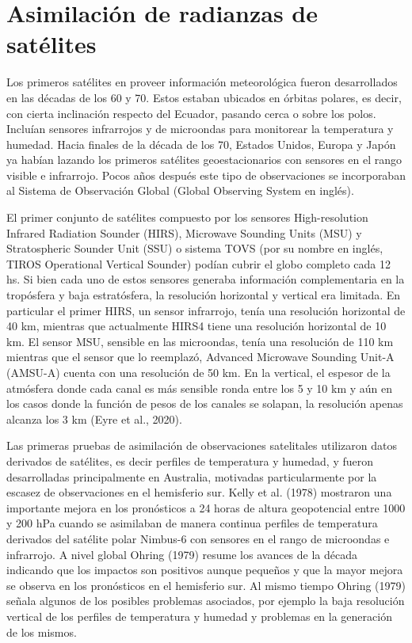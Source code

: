 \documentclass[12pt,oneside,a4paper]{reedthesis}
\begin{document}
\hypertarget{asim-rad}{%
\section{Asimilación de radianzas de satélites}\label{asim-rad}}

Los primeros satélites en proveer información meteorológica fueron desarrollados en las décadas de los 60 y 70. Estos estaban ubicados en órbitas polares, es decir, con cierta inclinación respecto del Ecuador, pasando cerca o sobre los polos. Incluían sensores infrarrojos y de microondas para monitorear la temperatura y humedad. Hacia finales de la década de los 70, Estados Unidos, Europa y Japón ya habían lazando los primeros satélites geoestacionarios con sensores en el rango visible e infrarrojo. Pocos años después este tipo de observaciones se incorporaban al Sistema de Observación Global (Global Observing System en inglés).

El primer conjunto de satélites compuesto por los sensores High-resolution Infrared Radiation Sounder (HIRS), Microwave Sounding Units (MSU) y Stratospheric Sounder Unit (SSU) o sistema TOVS (por su nombre en inglés, TIROS Operational Vertical Sounder) podían cubrir el globo completo cada 12 hs. Si bien cada uno de estos sensores generaba información complementaria en la tropósfera y baja estratósfera, la resolución horizontal y vertical era limitada. En particular el primer HIRS, un sensor infrarrojo, tenía una resolución horizontal de 40 km, mientras que actualmente HIRS4 tiene una resolución horizontal de 10 km. El sensor MSU, sensible en las microondas, tenía una resolución de 110 km mientras que el sensor que lo reemplazó, Advanced Microwave Sounding Unit-A (AMSU-A) cuenta con una resolución de 50 km. En la vertical, el espesor de la atmósfera donde cada canal es más sensible ronda entre los 5 y 10 km y aún en los casos donde la función de pesos de los canales se solapan, la resolución apenas alcanza los 3 km (Eyre et al., 2020).

Las primeras pruebas de asimilación de observaciones satelitales utilizaron datos derivados de satélites, es decir perfiles de temperatura y humedad, y fueron desarrolladas principalmente en Australia, motivadas particularmente por la escasez de observaciones en el hemisferio sur. Kelly et al. (1978) mostraron una importante mejora en los pronósticos a 24 horas de altura geopotencial entre 1000 y 200 hPa cuando se asimilaban de manera continua perfiles de temperatura derivados del satélite polar Nimbus-6 con sensores en el rango de microondas e infrarrojo. A nivel global Ohring (1979) resume los avances de la década indicando que los impactos son positivos aunque pequeños y que la mayor mejora se observa en los pronósticos en el hemisferio sur. Al mismo tiempo Ohring (1979) señala algunos de los posibles problemas asociados, por ejemplo la baja resolución vertical de los perfiles de temperatura y humedad y problemas en la generación de los mismos.
\end{document}
